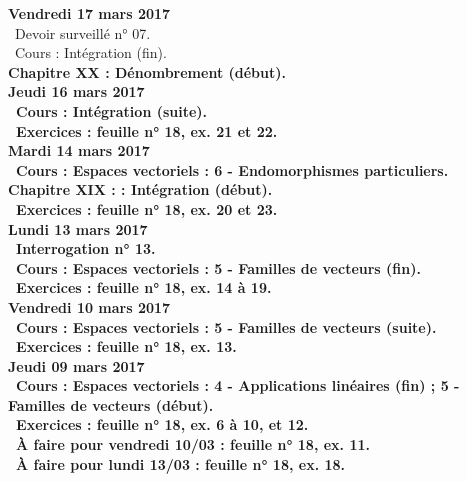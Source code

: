 \documentclass[12pt,a4paper]{article}
\begin{document}
\noindent\textbf{Vendredi 17 mars 2017}\\
\bu\ Devoir surveillé n° 07.\\
\bu\ Cours : Intégration (fin).\\
\bf Chapitre XX \rm : Dénombrement (début).\vspace{.4cm}\\

\noindent\textbf{Jeudi 16 mars 2017}\\
\bu\ Cours : Intégration (suite).\\
\bu\ Exercices : feuille n° 18, ex. 21 et 22.\vspace{.4cm}\\

\noindent\textbf{\bf Mardi 14 mars 2017} \\
\bu\ Cours : Espaces vectoriels : 6 - Endomorphismes particuliers.\\
\bf Chapitre XIX : \rm : Intégration (début).\\
\bu\ Exercices : feuille n° 18, ex. 20 et 23.\vspace{.4cm}\\

\noindent\textbf{\bf Lundi 13 mars 2017} \\
\bu\ Interrogation n° 13.\\
\bu\ Cours : Espaces vectoriels : 5 - Familles de vecteurs (fin).\\
\bu\ Exercices : feuille n° 18, ex. 14 à 19.\vspace{.4cm}\\

\noindent\textbf{Vendredi 10 mars 2017}\\
\bu\ Cours : Espaces vectoriels : 5 - Familles de vecteurs (suite).\\
\bu\ Exercices : feuille n° 18, ex. 13.\vspace{.4cm}\\

\noindent\textbf{Jeudi 09 mars 2017}\\
\bu\ Cours : Espaces vectoriels : 4 - Applications linéaires (fin) ; 5 - Familles de vecteurs (début).\\
\bu\ Exercices : feuille n° 18, ex. 6 à 10, et 12.\\
\bu\ À faire pour vendredi 10/03 : feuille n° 18, ex. 11.\\
\bu\ À faire pour lundi 13/03 : feuille n° 18, ex. 18.\vspace{.4cm}\\
\end{document}

